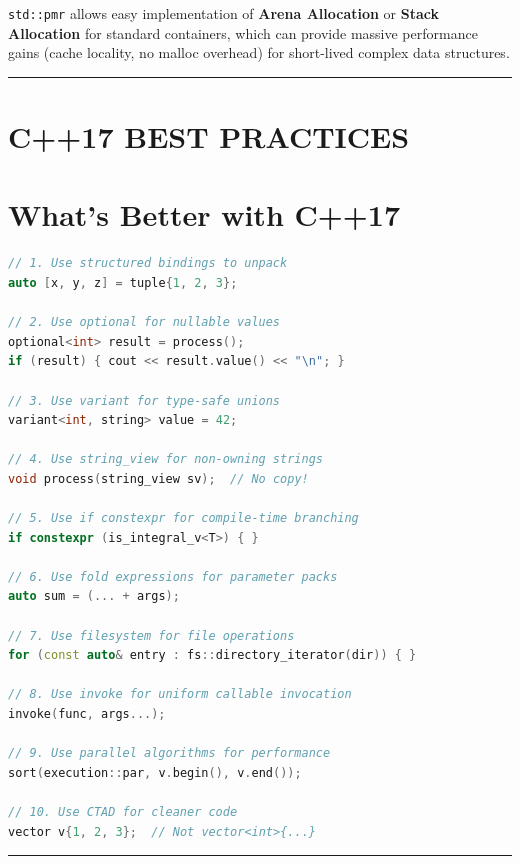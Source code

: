 \passthrough{\lstinline!std::pmr!} allows easy implementation of
\textbf{Arena Allocation} or \textbf{Stack Allocation} for standard
containers, which can provide massive performance gains (cache locality,
no malloc overhead) for short-lived complex data structures.

\begin{center}\rule{0.5\linewidth}{0.5pt}\end{center}

\hypertarget{c17-best-practices}{%
\section{C++17 BEST PRACTICES}\label{c17-best-practices}}

\hypertarget{whats-better-with-c17}{%
\section{What's Better with C++17}\label{whats-better-with-c17}}

\begin{lstlisting}[language={C++}]
// 1. Use structured bindings to unpack
auto [x, y, z] = tuple{1, 2, 3};

// 2. Use optional for nullable values
optional<int> result = process();
if (result) { cout << result.value() << "\n"; }

// 3. Use variant for type-safe unions
variant<int, string> value = 42;

// 4. Use string_view for non-owning strings
void process(string_view sv);  // No copy!

// 5. Use if constexpr for compile-time branching
if constexpr (is_integral_v<T>) { }

// 6. Use fold expressions for parameter packs
auto sum = (... + args);

// 7. Use filesystem for file operations
for (const auto& entry : fs::directory_iterator(dir)) { }

// 8. Use invoke for uniform callable invocation
invoke(func, args...);

// 9. Use parallel algorithms for performance
sort(execution::par, v.begin(), v.end());

// 10. Use CTAD for cleaner code
vector v{1, 2, 3};  // Not vector<int>{...}
\end{lstlisting}

\begin{center}\rule{0.5\linewidth}{0.5pt}\end{center}
